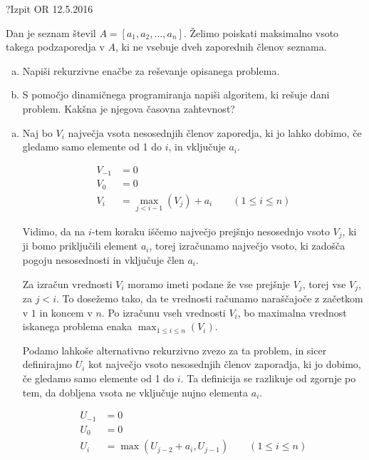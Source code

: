 \begin{naloga}{?}{Izpit OR 12.5.2016}
\begin{vprasanje}
Dan je seznam števil $A = [a_1, a_2, \dots, a_n]$.
Želimo poiskati maksimalno vsoto takega podzaporedja v $A$,
ki ne vsebuje dveh zaporednih členov seznama.

\begin{enumerate}[(a)]
\item Napiši rekurzivne enačbe za reševanje opisanega problema.

\item S pomočjo dinamičnega programiranja napiši algoritem,
ki rešuje dani problem.
Kakšna je njegova časovna zahtevnost?
\end{enumerate}
\end{vprasanje}
\begin{odgovor}

\begin{enumerate}[(a)]

\item Naj bo $V_i$ največja vsota nesosednjih členov zaporedja, ki jo lahko dobimo,
če gledamo samo elemente od 1 do $i$, in vključuje $a_i$.

\begin{align*}
V_{-1} &= 0 \\
V_0 &= 0 \\
V_i &= \max_{j < i - 1}\left(V_j\right) + a_i
\qquad (1 \le i \le n)
\end{align*}

Vidimo, da na $i$-tem koraku iščemo največjo prejšnjo nesosednjo vsoto $V_j$,
ki ji bomo priključili element $a_i$, torej izračunamo največjo vsoto, 
ki zadošča pogoju nesosednosti in vključuje člen $a_i$.

Za izračun vrednosti $V_i$ moramo imeti podane že vse prejšnje $V_j$, torej vse $V_j$, za $j < i$.
To dosežemo tako, da te vrednosti računamo naraščajoče z začetkom v $1$ in koncem v $n$.
Po izračunu vseh vrednosti $V_i$, bo maximalna vrednost iskanega problema enaka $\max_{1 \leq i \leq n}(V_i)$.

Podamo lahkoše  alternativno rekurzivno zvezo za ta problem, in sicer 
definirajmo $U_i$ kot največjo vsoto nesosednjih členov zaporadja, 
ki jo dobimo, če gledamo samo elemente od 1 do $i$.
Ta definicija se razlikuje od zgornje po tem, da dobljena vsota ne vključuje nujno elementa $a_i$.

\begin{align*}
U_{-1} &= 0 \\
U_0 &= 0 \\
U_i &= \max\left(U_{j - 2} + a_i, U_{j - 1}\right)
\qquad (1 \le i \le n)
\end{align*}


\end{enumerate}
\end{odgovor}
\end{naloga}
